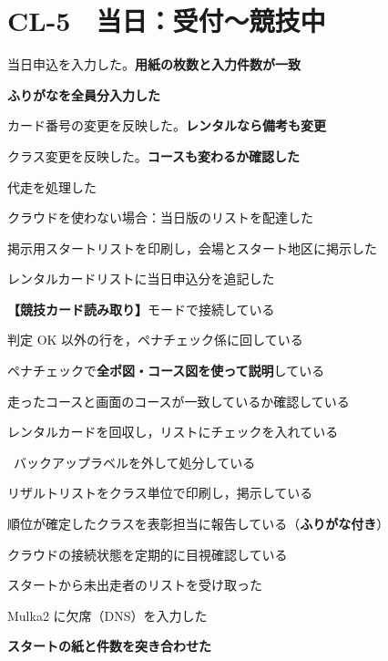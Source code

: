 \ckfoot

\clearpage
\section*{CL-5　当日：受付〜競技中}

\begin{cklist}
\item 当日申込を入力した。\textbf{用紙の枚数と入力件数が一致}
\item \textbf{ふりがなを全員分入力した}
\item カード番号の変更を反映した。\textbf{レンタルなら備考も変更}
\item クラス変更を反映した。\textbf{コースも変わるか確認した}
\item 代走を処理した
\item クラウドを使わない場合：当日版のリストを配達した
\item 掲示用スタートリストを印刷し，会場とスタート地区に掲示した
\item レンタルカードリストに当日申込分を追記した
\end{cklist}

\begin{cklist}
\item \textbf{【競技カード読み取り】}モードで接続している
\item 判定 OK 以外の行を，ペナチェック係に回している
\item ペナチェックで\textbf{全ポ図・コース図を使って説明}している
\item 走ったコースと画面のコースが一致しているか確認している
\item レンタルカードを回収し，リストにチェックを入れている
\item \tEMIT\ バックアップラベルを外して処分している
\item リザルトリストをクラス単位で印刷し，掲示している
\item 順位が確定したクラスを表彰担当に報告している（\textbf{ふりがな付き}）
\item クラウドの接続状態を定期的に目視確認している
\end{cklist}

\begin{cklist}
\item スタートから未出走者のリストを受け取った
\item Mulka2 に欠席（DNS）を入力した
\item \textbf{スタートの紙と件数を突き合わせた}
\end{cklist}

